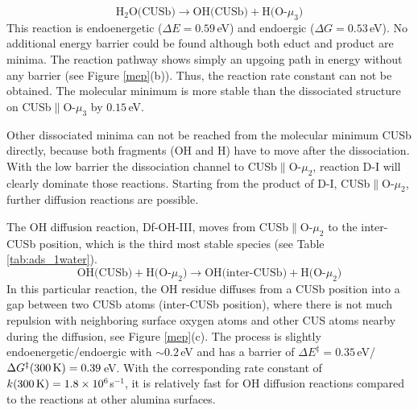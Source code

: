 \documentclass[11pt,DIV=13,BCOR=5mm,a4paper,headinclude]{scrbook}
\begin{document}
\begin{equation}
  \text{H$_2$O(CUSb)} \rightarrow \text{OH(CUSb)} + \text{H(O-$\mu_3$)} \tag{D-II}
      \label{dissII}
\end{equation}
This reaction is endoenergetic ($\Delta E=0.59\,$eV) and endoergic ($\Delta G=0.53\,$eV).
No additional energy barrier could be found although both educt and product are minima.
The reaction pathway shows simply an upgoing path in energy without any barrier (see Figure \ref{mep}(b)).
Thus, the reaction rate constant can not be obtained.
The molecular minimum is more stable than the dissociated structure on CUSb$\parallel$O-$\mu_3$ by $0.15\,$eV.

Other dissociated minima can not be reached from the molecular minimum CUSb directly, because both fragments (OH and H) have to move after the dissociation.
With the low barrier the dissociation channel to CUSb$\parallel$O-$\mu_2$, reaction D-I will clearly dominate those reactions.
Starting from the product of D-I, CUSb$\parallel$O-$\mu_2$, further diffusion reactions are possible.



The OH diffusion reaction, Df-OH-III, moves from CUSb$\parallel$O-$\mu_2$ to the inter-CUSb position, which is the third most stable species (see Table \ref{tab:ads_1water}).
\begin{equation}
 \text{OH(CUSb)} + \text{H(O-$\mu_2$)} \rightarrow \text{OH(inter-CUSb)} + \text{H(O-$\mu_2$)} \tag{Df-OH-III}
     \label{diffOHIII}
\end{equation}
In this particular reaction, the OH residue diffuses from a CUSb position into a gap between two CUSb atoms (inter-CUSb position), where there is not much repulsion with neighboring surface oxygen atoms and other CUS atoms nearby during the diffusion, see Figure \ref{mep}(c).
The process is slightly endoenergetic/endoergic with $\sim 0.2\,$eV and has a barrier of $\Delta E^\ddagger=0.35\,$eV/$\Delta G^\ddagger(\textrm{300\,K})=0.39\,$eV.
With the corresponding rate constant of $k(\textrm{300\,K})=1.8\times 10^6$s$^{-1}$, it is relatively fast for OH diffusion reactions compared to the reactions at other alumina surfaces\cite{WirthJPCC2012,Wirth2016}.
\end{document}
